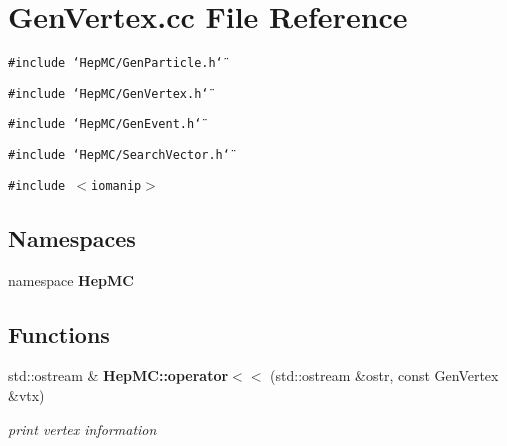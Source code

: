 \section{Gen\-Vertex.cc File Reference}
\label{GenVertex_8cc}
{\tt \#include \char`\"{}Hep\-MC/Gen\-Particle.h\char`\"{}}\par
{\tt \#include \char`\"{}Hep\-MC/Gen\-Vertex.h\char`\"{}}\par
{\tt \#include \char`\"{}Hep\-MC/Gen\-Event.h\char`\"{}}\par
{\tt \#include \char`\"{}Hep\-MC/Search\-Vector.h\char`\"{}}\par
{\tt \#include $<$iomanip$>$}\par
\subsection*{Namespaces}
\begin{CompactItemize}
\item 
namespace {\bf Hep\-MC}
\end{CompactItemize}
\subsection*{Functions}
\begin{CompactItemize}
\item 
std::ostream \& {\bf Hep\-MC::operator$<$$<$} (std::ostream \&ostr, const Gen\-Vertex \&vtx)
\begin{CompactList}\small\item\em print vertex information \item\end{CompactList}\end{CompactItemize}
